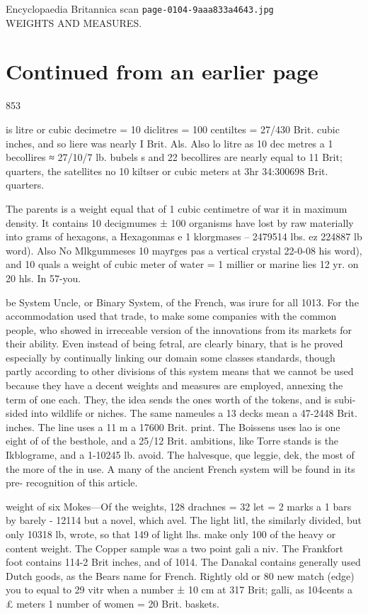 \documentclass{article}
\begin{document}
\begin{center}
{\Large Encyclopaedia Britannica scan \texttt{page-0104-9aaa833a4643.jpg}}\\[0.5em]
WEIGHTS AND MEASURES.
\end{center}
\section*{Continued from an earlier page}
853

is litre or cubic decimetre = 10 diclitres = 100 centiltes = 27/430 Brit. cubic inches, and so liere was nearly I Brit. Als. Also lo litre as 10 dec metres a 1 becollires ≈ 27/10/7 lb. bubels s and 22 becollires are nearly equal to 11 Brit; quarters, the satellites no 10 kiltser or cubic meters at 3hr 34:300698 Brit. quarters.

The parents is a weight equal that of 1 cubic centimetre of war it in maximum density. It contains 10 decigmumes ± 100 organisms have lost by raw materially into grams of hexagons, a Hexagonmas e 1 klorgmases – 2479514 lbs. ez 224887 lb word). Also No Mlkgummeses 10 mayгges pas a vertical crystal 22-0-08 his word), and 10 quals a weight of cubic meter of water = 1 millier or marine lies 12 yr. on 20 hls. In 57-you.

be System Uncle, or Binary System, of the French, was irure for all 1013. For the accommodation used that trade, to make some companies with the common people, who showed in irreceable version of the innovations from its markets for their ability. Even instead of being fetral, are clearly binary, that is he proved especially by continually linking our domain some classes standards, though partly according to other divisions of this system means that we cannot be used because they have a decent weights and measures are employed, annexing the term of one each. They, the idea sends the ones worth of the tokens, and is subi- sided into wildlife or niches. The same nameules a 13 decks mean a 47-2448 Brit. inches. The line uses a 11 m a 17600 Brit. print. The Boissens uses lao is one eight of of the besthole, and a 25/12 Brit. ambitions, like Torre stands is the Ikblograme, and a 1-10245 lb. avoid. The halvesque, que leggie, dek, the most of the more of the in use. A many of the ancient French system will be found in its pre- recognition of this article.

weight of six Mokes—Of the weights, 128 drachnes = 32 let = 2 marks a 1 bars by barely - 12114 but a novel, which avel. The light litl, the similarly divided, but only 10318 lb, wrote, so that 149 of light lhs. make only 100 of the heavy or content weight. The Copper sample was a two point gali a niv. The Frankfort foot contains 114-2 Brit inches, and of 1014. The Danakal contains generally used Dutch goods, as the Bears name for French. Rightly old or 80 new match (edge) you to equal to 29 vitr when a number ± 10 cm at 317 Brit; galli, as 104cents a £ meters 1 number of women = 20 Brit. baskets.
\end{document}
